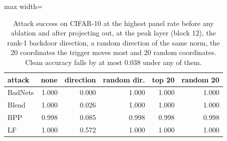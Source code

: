 \begin{table}[htbp]
\centering
\small
\caption{Attack success on CIFAR-10 at the highest panel rate before any ablation and after projecting out, at the peak layer (block 12), the rank-1 backdoor direction, a random direction of the same norm, the 20 coordinates the trigger moves most and 20 random coordinates. Clean accuracy falls by at most 0.038 under any of them.}
\label{tab:direction-ablation}
\begin{adjustbox}{max width=\linewidth}
\begin{tabular}{lrrrrr}
\toprule
attack & none & direction & random dir. & top 20 & random 20 \\
\midrule
BadNets & 1.000 & 0.000 & 1.000 & 1.000 & 1.000 \\
Blend & 1.000 & 0.026 & 1.000 & 1.000 & 1.000 \\
BPP & 0.998 & 0.085 & 0.998 & 0.998 & 0.998 \\
LF & 1.000 & 0.572 & 1.000 & 1.000 & 1.000 \\
\bottomrule
\end{tabular}
\end{adjustbox}
\end{table}
